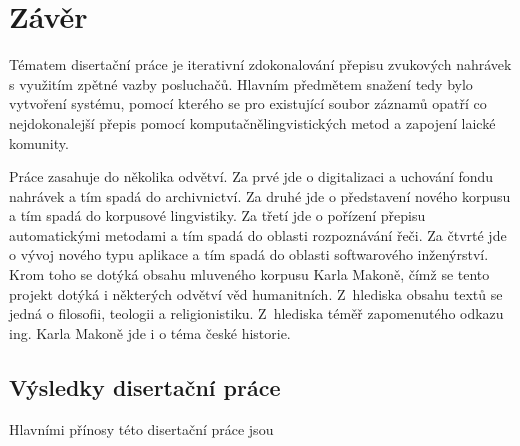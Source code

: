 \chapter{Závěr}
\label{kap:zaver}

Tématem disertační práce je iterativní zdokonalování přepisu zvukových
nahrávek s využitím zpětné vazby posluchačů. Hlavním předmětem snažení
tedy bylo vytvoření systému, pomocí kterého se pro existující soubor
záznamů opatří co nejdokonalejší přepis pomocí komputačnělingvistických metod a
zapojení laické komunity.

Práce zasahuje do několika odvětví.
Za prvé jde o digitalizaci a uchování fondu nahrávek a tím spadá do
archivnictví.
Za druhé jde o představení nového korpusu a tím spadá do korpusové lingvistiky.
Za třetí jde o pořízení přepisu automatickými metodami a tím spadá do oblasti
rozpoznávání řeči.
Za čtvrté jde o vývoj nového typu aplikace a tím spadá do oblasti
softwarového inženýrství.
Krom toho se dotýká obsahu
mluveného korpusu Karla Makoně, čímž se tento projekt dotýká i některých
odvětví věd humanitních. Z~hlediska obsahu textů se jedná o filosofii, teologii
a religionistiku. Z~hlediska téměř zapomenutého odkazu ing. Karla Makoně jde i o
téma české historie.

\section{Výsledky disertační práce}
\label{sec:zaver:vysledky}

Hlavními přínosy této disertační práce jsou

